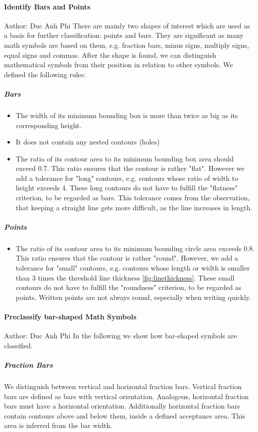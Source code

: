 \documentclass[11pt]{article}
\begin{document}
	\paragraph{Identify Bars and Points}
	\small{Author: Duc Anh Phi} \newline \newline
	There are mainly two shapes of interest which are used as a basis for further classification: points and bars. They are significant as many math symbols are based on them, e.g. fraction bars, minus signs, multiply signs, equal signs and commas. After the shape is found, we can distinguish mathematical symbols from their position in relation to other symbols. We defined the following rules:
	
	\subparagraph{Bars}\label{bars}
	\begin{itemize}
		\item The width of its minimum bounding box is more than twice as big as its corresponding height.
		\item It does not contain any nested contours (holes)
		\item The ratio of its contour area to its minimum bounding box area should exceed 0.7. This ratio ensures that the contour is rather "flat". However we add a tolerance for "long" contours, e.g. contours whose ratio of width to height exceeds 4. These long contours do not have to fulfill the "flatness" criterion, to be regarded as bars. This tolerance comes from the observation, that keeping a straight line gets more difficult, as the line increases in length. 
	\end{itemize}

	\subparagraph{Points}
	\begin{itemize}
		\item The ratio of its contour area to its minimum bounding circle area exceeds 0.8. This ratio ensures that the contour is rather "round". However, we add a tolerance for "small" contours, e.g. contours whose length or width is smaller than 3 times the threshold line thickness \ref{fig:linethickness}. These small contours do not have to fulfill the "roundness" criterion, to be regarded as points. Written points are not always round, especially when writing quickly.
	\end{itemize}

	\paragraph{Preclassify bar-shaped Math Symbols}
	\small{Author: Duc Anh Phi} \newline \newline
	In the following we show how bar-shaped symbols are classified.
	\subparagraph{Fraction Bars}\label{fractionbar}
	We distinguish between vertical and horizontal fraction bars.
	Vertical fraction bars are defined as bars with vertical orientation. Analogous, horizontal fraction bars must have a horizontal orientation. Additionally horizontal fraction bars contain contours above and below them, inside a defined acceptance area. This area is inferred from the bar width.
	
\end{document}
